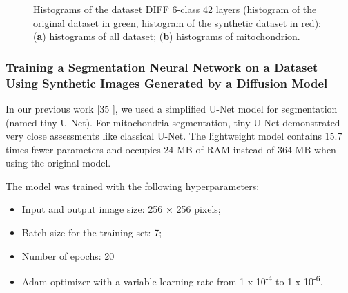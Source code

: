\documentclass[journal,article,submit,pdftex,moreauthors]{Definitions/mdpi}
\begin{document}
\begin{figure}[H]
	\hspace{0.2cm}
	\caption{Histograms of the dataset DIFF 6-class 42 layers (histogram of the original dataset in green, histogram of the synthetic dataset in red): (\textbf{a}) histograms of all dataset; (\textbf{b}) histograms of mitochondrion.\label{fig11}}
\end{figure}

\subsubsection{Training a Segmentation Neural Network on a Dataset Using Synthetic Images Generated by a Diffusion Model}

In our previous work [35 ], we used a simplified U-Net model for segmentation (named tiny-U-Net). For mitochondria segmentation, tiny-U-Net demonstrated very close assessments like classical U-Net. The lightweight model contains 15.7 times fewer parameters and occupies 24 MB of RAM instead of 364 MB when using the original model.

The model was trained with the following hyperparameters:

\begin{itemize}
	\item {Input and output image size: 256 × 256 pixels;}
	\item {Batch size for the training set: 7;}
	\item {Number of epochs: 20}
	\item {Adam optimizer with a variable learning rate from 1 x 10\textsuperscript{-4} to 1 x 10\textsuperscript{-6}.}
\end{itemize}
\end{document}
